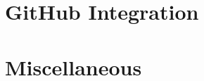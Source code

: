 \documentclass[10pt]{article}
\begin{document}
\section{GitHub Integration} %
\label{sec:github_integration}




\section{Miscellaneous} %
\label{sec:miscellaneous}






\end{document}
